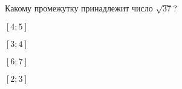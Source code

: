 \begin{ex}
	\begin{condition}
		Какому промежутку принадлежит число $\sqrt{37}$?
		
		\selectanswer
		\begin{enumcols}[columns=4]
			\item $[4;5]$
			\item $[3;4]$
			\item $[6;7]$
			\item $[2;3]$
		\end{enumcols}
	\end{condition}
\end{ex}